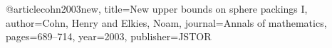 @article{cohn2003new,
  title={New upper bounds on sphere packings I},
  author={Cohn, Henry and Elkies, Noam},
  journal={Annals of mathematics},
  pages={689--714},
  year={2003},
  publisher={JSTOR}
}
